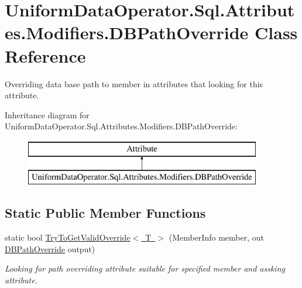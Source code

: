 \hypertarget{class_uniform_data_operator_1_1_sql_1_1_attributes_1_1_modifiers_1_1_d_b_path_override}{}\section{Uniform\+Data\+Operator.\+Sql.\+Attributes.\+Modifiers.\+D\+B\+Path\+Override Class Reference}
\label{class_uniform_data_operator_1_1_sql_1_1_attributes_1_1_modifiers_1_1_d_b_path_override}


Overriding data base path to member in attributes that looking for this attribute.  


Inheritance diagram for Uniform\+Data\+Operator.\+Sql.\+Attributes.\+Modifiers.\+D\+B\+Path\+Override\+:\begin{figure}[H]
\begin{center}
\leavevmode
\includegraphics[height=2.000000cm]{d0/daf/class_uniform_data_operator_1_1_sql_1_1_attributes_1_1_modifiers_1_1_d_b_path_override}
\end{center}
\end{figure}
\subsection*{Static Public Member Functions}
\begin{DoxyCompactItemize}
\item 
static bool \mbox{\hyperlink{class_uniform_data_operator_1_1_sql_1_1_attributes_1_1_modifiers_1_1_d_b_path_override_aa7601220e39d8a68e911e4215bf94cb5}{Try\+To\+Get\+Valid\+Override$<$ T $>$}} (Member\+Info member, out \mbox{\hyperlink{class_uniform_data_operator_1_1_sql_1_1_attributes_1_1_modifiers_1_1_d_b_path_override}{D\+B\+Path\+Override}} output)
\begin{DoxyCompactList}\small\item\em Looking for path overriding attribute suitable for specified member and assking attribute. \end{DoxyCompactList}\end{DoxyCompactItemize}
